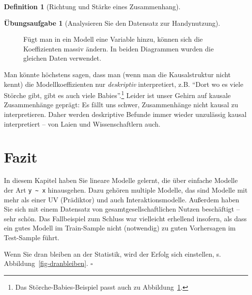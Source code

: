 \documentclass[
  a4paper,
  DIV=11]{scrreprt}
\theoremstyle{definition}
\newtheorem{exercise}{Übungsaufgabe}[chapter]
\theoremstyle{definition}
\theoremstyle{definition}
\newtheorem{definition}{Definition}[chapter]
\theoremstyle{remark}
\begin{document}
\begin{definition}[Richtung und Stärke eines
Zusammenhang]
\begin{exercise}[Analysieren Sie den Datensatz zur
Handynutzung]
\begin{figure}
\begin{minipage}{0.50\linewidth}
{}


\end{minipage}%

\caption{\label{fig-confounder}Fügt man in ein Modell eine Variable
hinzu, können sich die Koeffizienten massiv ändern. In beiden Diagrammen
wurden die gleichen Daten verwendet.}

\end{figure}%

Man könnte höchstens sagen, dass man (wenn man die Kausalstruktur nicht
kennt) die Modellkoeffizienten nur \emph{deskriptiv} interpretiert, z.B.
``Dort wo es viele Störche gibt, gibt es auch viele Babies''.\footnote{Das
  Störche-Babies-Beispiel passt auch zu Abbildung~\ref{fig-confounder}.}
Leider ist unser Gehirn auf kausale Zusammenhänge geprägt: Es fällt uns
schwer, Zusammenhänge nicht kausal zu interpretieren. Daher werden
deskriptive Befunde immer wieder unzulässig kausal interpretiert -- von
Laien und Wissenschaftlern auch.

\section{Fazit}\label{fazit-4}

In diesem Kapitel haben Sie lineare Modelle gelernt, die über einfache
Modelle der Art \texttt{y\ \textasciitilde{}\ x} hinausgehen. Dazu
gehören multiple Modelle, das sind Modelle mit mehr als einer UV
(Prädiktor) und auch Interaktionsmodelle. Außerdem haben Sie sich mit
einem Datensatz von gesamtgesellschaftlichen Nutzen beschäftigt -- sehr
schön. Das Fallbeispiel zum Schluss war vielleicht erhellend insofern,
als dass ein gutes Modell im Train-Sample nicht (notwendig) zu guten
Vorhersagen im Test-Sample führt.

\begin{tcolorbox}[enhanced jigsaw, leftrule=.75mm, opacitybacktitle=0.6, colback=white, colframe=quarto-callout-important-color-frame, coltitle=black, colbacktitle=quarto-callout-important-color!10!white, opacityback=0, left=2mm, breakable, titlerule=0mm, toptitle=1mm, bottomtitle=1mm, rightrule=.15mm, title=\textcolor{quarto-callout-important-color}{\faExclamation}\hspace{0.5em}{Wichtig}, arc=.35mm, bottomrule=.15mm, toprule=.15mm]

Wenn Sie dran bleiben an der Statistik, wird der Erfolg sich einstellen,
s. Abbildung~\ref{fig-dranbleiben}. \(\square\)


\end{tcolorbox}
\end{exercise}
\end{definition}
\end{document}
